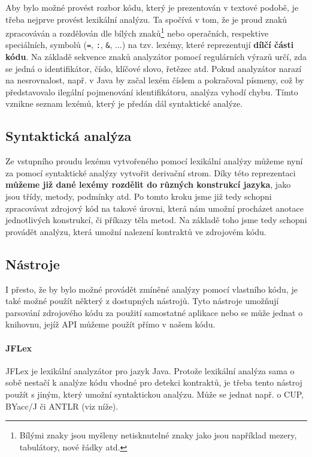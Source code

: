 			Aby bylo možné provést rozbor kódu, který je prezentován v textové podobě, je třeba nejprve provést lexikální analýzu. Ta spočívá v tom, že je proud znaků zpracováván a rozdělován dle bílých znaků\footnote{Bílými znaky jsou myšleny netisknutelné znaky jako jsou například mezery, tabulátory, nové řádky atd.} nebo operačních, respektive speciálních, symbolů (\texttt{=}, \texttt{:}, \texttt{\&}, ...) na tzv. lexémy, které reprezentují \textbf{\textcolor{pblue}{dílčí části kódu}}. Na základě sekvence znaků analyzátor pomocí regulárních výrazů určí, zda se jedná o identifikátor, číslo, klíčové slovo, řetězec atd. Pokud analyzátor narazí na nesrovnalost, např. v Java by začal lexém číslem a pokračoval písmeny, což by představovalo ilegální pojmenování identifikátoru, analýza vyhodí chybu. Tímto vznikne seznam lexémů, který je předán dál syntaktické analýze.
			
		\subsection{Syntaktická analýza}
			Ze vstupního proudu lexému vytvořeného pomocí lexikální analýzy můžeme nyní za pomocí syntaktické analýzy vytvořit derivační strom. Díky této reprezentaci \textbf{\textcolor{pblue}{můžeme již dané lexémy rozdělit do různých konstrukcí jazyka}}, jako jsou třídy, metody, podmínky atd. Po tomto kroku jsme již tedy schopni zpracovávat zdrojový kód na takové úrovni, která nám umožní procházet anotace jednotlivých konstrukcí, či příkazy těla metod. Na základě toho jsme tedy schopni provádět analýzu, která umožní nalezení kontraktů ve zdrojovém kódu. 			
			
		\subsection{Nástroje}
			I přesto, že by bylo možné provádět zmíněné analýzy pomocí vlastního kódu, je také možné použít některý z dostupných nástrojů. Tyto nástroje umožňují parsování zdrojového kódu za použití samostatné aplikace nebo se může jednat o knihovnu, jejíž API můžeme použít přímo v našem kódu.
			
			\paragraph{JFLex}
				JFLex \cite{jflex} je lexikální analyzátor pro jazyk Java. Protože lexikální analýza sama o sobě nestačí k analýze kódu vhodné pro detekci kontraktů, je třeba tento nástroj použít s jiným, který umožní syntaktickou analýzu. Může se jednat např. o CUP, BYacc/J či ANTLR (viz níže). 						
			
